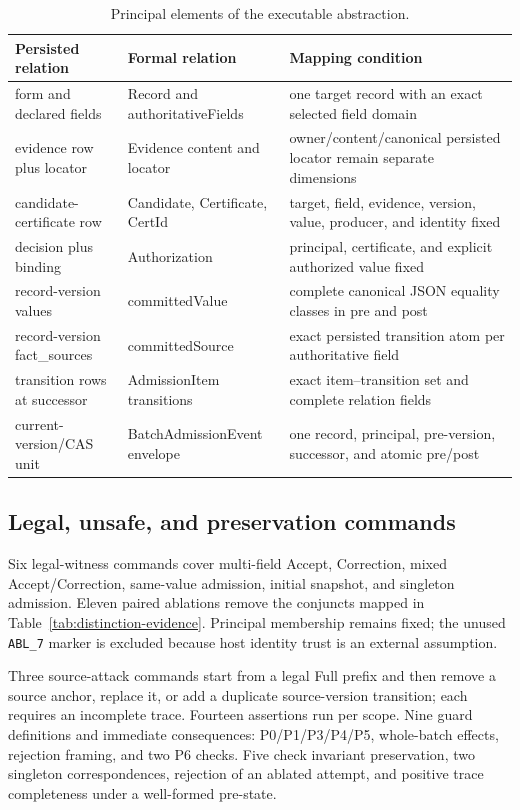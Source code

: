 \documentclass[11pt,a4paper]{article}
\newcommand{\code}[1]{\nolinkurl{#1}}
\begin{document}
\begin{table}[t]
\centering
\caption{Principal elements of the executable abstraction.}
\label{tab:abstraction}
\begin{tabularx}{\textwidth}{@{}>{\raggedright\arraybackslash}p{}>{\raggedright\arraybackslash}p{}>{\raggedright\arraybackslash}X@{}}
\toprule
Persisted relation & Formal relation & Mapping condition \\
\midrule
form and declared fields & Record and authoritativeFields & one target record with an exact selected field domain \\
evidence row plus locator & Evidence content and locator & owner/content/canonical persisted locator remain separate dimensions \\
candidate-certificate row & Candidate, Certificate, CertId & target, field, evidence, version, value, producer, and identity fixed \\
decision plus binding & Authorization & principal, certificate, and explicit authorized value fixed \\
record-version values & committedValue & complete canonical JSON equality classes in pre and post \\
record-version fact\_sources & committedSource & exact persisted transition atom per authoritative field \\
transition rows at successor & AdmissionItem transitions & exact item--transition set and complete relation fields \\
current-version/CAS unit & BatchAdmissionEvent envelope & one record, principal, pre-version, successor, and atomic pre/post \\
\bottomrule
\end{tabularx}
\end{table}

\subsection{Legal, unsafe, and preservation commands}

Six legal-witness commands cover multi-field Accept, Correction, mixed Accept/Correction, same-value admission, initial snapshot, and singleton admission. Eleven paired ablations remove the conjuncts mapped in Table~\ref{tab:distinction-evidence}. Principal membership remains fixed; the unused \code{ABL\_7} marker is excluded because host identity trust is an external assumption.

Three source-attack commands start from a legal Full prefix and then remove a source anchor, replace it, or add a duplicate source-version transition; each requires an incomplete trace. Fourteen assertions run per scope. Nine guard definitions and immediate consequences: P0/P1/P3/P4/P5, whole-batch effects, rejection framing, and two P6 checks. Five check invariant preservation, two singleton correspondences, rejection of an ablated attempt, and positive trace completeness under a well-formed pre-state.
\end{document}
